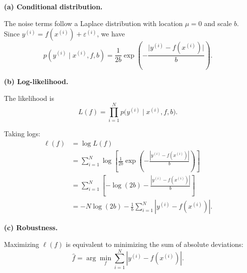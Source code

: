 \documentclass{article}
\begin{document}
\textbf{(a) Conditional distribution.}

The noise terms follow a Laplace distribution with location $\mu = 0$ and scale $b$.
Since $y^{(i)} = f(x^{(i)}) + \varepsilon^{(i)}$, we have
\[
	p(y^{(i)} \mid x^{(i)}, f, b)
	= \frac{1}{2b} \exp\!\left(
	-\frac{\big|y^{(i)} - f(x^{(i)})\big|}{b}
	\right).
\]

\textbf{(b) Log-likelihood.}

The likelihood is
\[
	L(f) = \prod_{i=1}^N p\!\big(y^{(i)} \mid x^{(i)}, f, b\big).
\]

Taking logs:
\begin{align*}
	\ell(f) & = \log L(f)                                                     \\
	        & = \sum_{i=1}^N \log \left[
	\frac{1}{2b} \exp\!\left(
	-\frac{|y^{(i)} - f(x^{(i)})|}{b}
	\right)
	\right]                                                                   \\
	        & = \sum_{i=1}^N \left[
	-\log(2b) - \frac{|y^{(i)} - f(x^{(i)})|}{b}
	\right]                                                                   \\
	        & = -N \log(2b) - \frac{1}{b}\sum_{i=1}^N |y^{(i)} - f(x^{(i)})|.
\end{align*}

\textbf{(c) Robustness.}

Maximizing $\ell(f)$ is equivalent to minimizing the sum of absolute deviations:
\[
	\hat f = \arg\min_f \sum_{i=1}^N |y^{(i)} - f(x^{(i)})|.
\]
\end{document}

